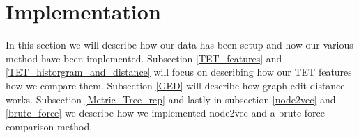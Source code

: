 \section{Implementation}\label{Implementation}
In this section we will describe how our data has been setup and how our various method have been implemented. Subsection \ref{TET_features} and \ref{TET_historgram_and_distance} will focus on describing how our TET features how we compare them. Subsection \ref{GED} will describe how graph edit distance works. Subsection \ref{Metric_Tree_rep} and lastly in subsection \ref{node2vec} and \ref{brute_force} we describe how we implemented node2vec and a brute force comparison method.







